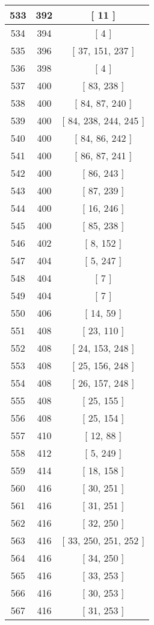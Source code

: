 \begin{center}
\begin{longtable}[H]{|| c c c ||}
\hline
533 & 392 & [ 11 ] \\ 
\hline
534 & 394 & [ 4 ] \\ 
\hline
535 & 396 & [ 37, 151, 237 ] \\ 
\hline
536 & 398 & [ 4 ] \\ 
\hline
537 & 400 & [ 83, 238 ] \\ 
\hline
538 & 400 & [ 84, 87, 240 ] \\ 
\hline
539 & 400 & [ 84, 238, 244, 245 ] \\ 
\hline
540 & 400 & [ 84, 86, 242 ] \\ 
\hline
541 & 400 & [ 86, 87, 241 ] \\ 
\hline
542 & 400 & [ 86, 243 ] \\ 
\hline
543 & 400 & [ 87, 239 ] \\ 
\hline
544 & 400 & [ 16, 246 ] \\ 
\hline
545 & 400 & [ 85, 238 ] \\ 
\hline
546 & 402 & [ 8, 152 ] \\ 
\hline
547 & 404 & [ 5, 247 ] \\ 
\hline
548 & 404 & [ 7 ] \\ 
\hline
549 & 404 & [ 7 ] \\ 
\hline
550 & 406 & [ 14, 59 ] \\ 
\hline
551 & 408 & [ 23, 110 ] \\ 
\hline
552 & 408 & [ 24, 153, 248 ] \\ 
\hline
553 & 408 & [ 25, 156, 248 ] \\ 
\hline
554 & 408 & [ 26, 157, 248 ] \\ 
\hline
555 & 408 & [ 25, 155 ] \\ 
\hline
556 & 408 & [ 25, 154 ] \\ 
\hline
557 & 410 & [ 12, 88 ] \\ 
\hline
558 & 412 & [ 5, 249 ] \\ 
\hline
559 & 414 & [ 18, 158 ] \\ 
\hline
560 & 416 & [ 30, 251 ] \\ 
\hline
561 & 416 & [ 31, 251 ] \\ 
\hline
562 & 416 & [ 32, 250 ] \\ 
\hline
563 & 416 & [ 33, 250, 251, 252 ] \\ 
\hline
564 & 416 & [ 34, 250 ] \\ 
\hline
565 & 416 & [ 33, 253 ] \\ 
\hline
566 & 416 & [ 30, 253 ] \\ 
\hline
567 & 416 & [ 31, 253 ] \\ 

\end{longtable}
\end{center}
